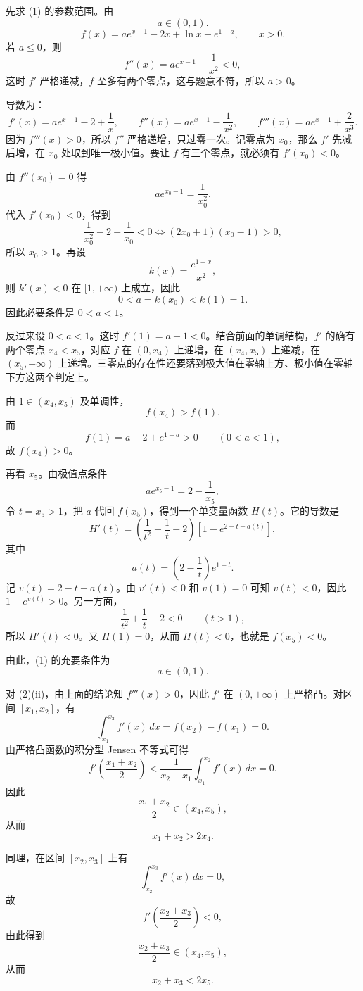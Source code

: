 \begin{solution}
先求 (1) 的参数范围。由
\[
a\in(0,1).
\]
\[
f(x) = ae^{x-1} - 2x + \ln x + e^{1-a},\qquad x>0.
\]
若 \(a\le0\)，则
\[
f''(x)=ae^{x-1}-\frac1{x^2}<0,
\]
这时 \(f'\) 严格递减，\(f\) 至多有两个零点，这与题意不符，所以 \(a>0\)。

导数为：
\[
f'(x) = ae^{x-1} - 2 + \frac{1}{x},\qquad
f''(x) = ae^{x-1} - \frac{1}{x^2},\qquad
f'''(x) = ae^{x-1} + \frac{2}{x^3}.
\]
因为 \(f'''(x)>0\)，所以 \(f''\) 严格递增，只过零一次。记零点为 \(x_0\)，那么 \(f'\) 先减后增，在 \(x_0\) 处取到唯一极小值。要让 \(f\) 有三个零点，就必须有 \(f'(x_0)<0\)。

由 \(f''(x_0)=0\) 得
\[
ae^{x_0-1}=\frac{1}{x_0^2}.
\]
代入 \(f'(x_0)<0\)，得到
\[
\frac{1}{x_0^2}-2+\frac{1}{x_0}<0
\iff
(2x_0+1)(x_0-1)>0,
\]
所以 \(x_0>1\)。再设
\[
k(x)=\frac{e^{1-x}}{x^2},
\]
则 \(k'(x)<0\) 在 \([1,+\infty)\) 上成立，因此
\[
0<a=k(x_0)<k(1)=1.
\]
因此必要条件是 \(0<a<1\)。

反过来设 \(0<a<1\)。这时 \(f'(1)=a-1<0\)。结合前面的单调结构，\(f'\) 的确有两个零点 \(x_4<x_5\)，对应 \(f\) 在 \((0,x_4)\) 上递增，在 \((x_4,x_5)\) 上递减，在 \((x_5,+\infty)\) 上递增。三零点的存在性还要落到极大值在零轴上方、极小值在零轴下方这两个判定上。

由 \(1\in(x_4,x_5)\) 及单调性，
\[
f(x_4)>f(1).
\]
而
\[
f(1)=a-2+e^{1-a}>0\qquad(0<a<1),
\]
故 \(f(x_4)>0\)。

再看 \(x_5\)。由极值点条件
\[
ae^{x_5-1}=2-\frac1{x_5},
\]
令 \(t=x_5>1\)，把 \(a\) 代回 \(f(x_5)\)，得到一个单变量函数 \(H(t)\)。它的导数是
\[
H'(t)=\left(\frac{1}{t^2}+\frac{1}{t}-2\right)\left[1-e^{2-t-a(t)}\right],
\]
其中
\[
a(t)=\left(2-\frac1t\right)e^{1-t}.
\]
记 \(v(t)=2-t-a(t)\)。由 \(v'(t)<0\) 和 \(v(1)=0\) 可知 \(v(t)<0\)，因此 \(1-e^{v(t)}>0\)。另一方面，
\[
\frac{1}{t^2}+\frac{1}{t}-2<0\qquad (t>1),
\]
所以 \(H'(t)<0\)。又 \(H(1)=0\)，从而 \(H(t)<0\)，也就是 \(f(x_5)<0\)。

由此，(1) 的充要条件为
\[
a\in(0,1).
\]

对 (2)(ii)，由上面的结论知 \(f'''(x)>0\)，因此 \(f'\) 在 \((0,+\infty)\) 上严格凸。对区间 \([x_1,x_2]\)，有
\[
\int_{x_1}^{x_2}f'(x)\,dx=f(x_2)-f(x_1)=0.
\]
由严格凸函数的积分型 Jensen 不等式可得
\[
f'\left(\frac{x_1+x_2}{2}\right)<\frac{1}{x_2-x_1}\int_{x_1}^{x_2}f'(x)\,dx=0.
\]
因此
\[
\frac{x_1+x_2}{2}\in(x_4,x_5),
\]
从而
\[
x_1+x_2>2x_4.
\]

同理，在区间 \([x_2,x_3]\) 上有
\[
\int_{x_2}^{x_3}f'(x)\,dx=0,
\]
故
\[
f'\left(\frac{x_2+x_3}{2}\right)<0,
\]
由此得到
\[
\frac{x_2+x_3}{2}\in(x_4,x_5),
\]
从而
\[
x_2+x_3<2x_5.
\]
\end{solution}


